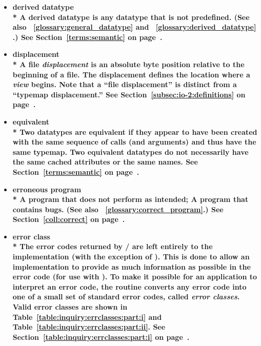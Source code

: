 \begin{itemize}
\label{glossary:derived_datatype}
\item \bf{ derived datatype} \\*
A derived datatype is any datatype that is not predefined.
(See also ~\ref{glossary:general_datatype} and ~\ref{glossary:derived_datatype} .)
See Section~\ref{terms:semantic} on page~\pageref{terms:semantic}.

\label{glossary:displacement}
\item \bf{ displacement} \\*
A file {\it displacement} is an absolute byte position
relative to the beginning of a file.
The displacement defines the location where a {\it view} begins.
Note that a ``file displacement'' is distinct from a ``typemap displacement.''
See Section~\ref{subsec:io-2:definitions} on page~\pageref{subsec:io-2:definitions}.

\label{glossary:equivalent}
\item \bf{ equivalent} \\*
Two datatypes are equivalent if they appear to have been created with
the same sequence of calls (and arguments) and thus have the same
typemap.  Two equivalent datatypes do not necessarily have the same
cached attributes or the same names.
See Section~\ref{terms:semantic} on page~\pageref{terms:semantic}.

\label{glossary:erroneous_program}
\item \bf{ erroneous program} \\*
A program that does not perform as intended; A program that contains bugs. 
(See also ~\ref{glossary:correct_program}.)
See Section~\ref{coll:correct} on page~\pageref{coll:correct}.

\label{glossary:error_class}
\item \bf{ error class} \\*
The error codes returned by \MPI/ are left entirely to the
implementation (with the
exception of ).  This is done to allow an implementation to
provide as much information as possible in the error code (for use with
).
To make it possible for an application to interpret an error code, the routine
converts any error code into one of a small set of standard error
codes, called {\em error classes}.  
Valid error classes are shown in Table~\ref{table:inquiry:errclasses:part:i}
and Table~\ref{table:inquiry:errclasses:part:ii}. 
See Section~\ref{table:inquiry:errclasses:part:i} on page~\pageref{table:inquiry:errclasses:part:i}.


\end{itemize}

